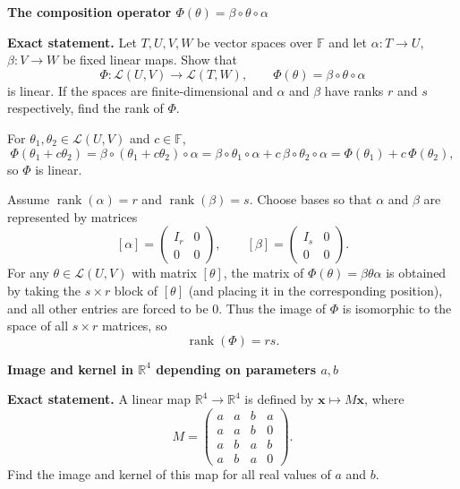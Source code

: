 \begin{problem}[CP-I-0122]
\label{prob:cp-i-0122}
\textbf{The composition operator $\Phi(\theta)=\beta\circ\theta\circ\alpha$}

\textbf{Exact statement.}
\hspace*{1.5em}Let $T,U,V,W$ be vector spaces over $\mathbb F$ and let $\alpha:T\to U$, $\beta:V\to W$ be fixed linear maps.
Show that
\[
\Phi:\mathcal L(U,V)\to \mathcal L(T,W),\qquad \Phi(\theta)=\beta\circ\theta\circ\alpha
\]
is linear. If the spaces are finite-dimensional and $\alpha$ and $\beta$ have ranks $r$ and $s$ respectively,
find the rank of $\Phi$.
\end{problem}

\begin{solution}
For $\theta_1,\theta_2\in\mathcal L(U,V)$ and $c\in\mathbb F$,
\[
\Phi(\theta_1+c\theta_2)
=\beta\circ(\theta_1+c\theta_2)\circ\alpha
=\beta\circ\theta_1\circ\alpha + c\,\beta\circ\theta_2\circ\alpha
=\Phi(\theta_1)+c\,\Phi(\theta_2),
\]
so $\Phi$ is linear.

Assume $\operatorname{rank}(\alpha)=r$ and $\operatorname{rank}(\beta)=s$.
Choose bases so that $\alpha$ and $\beta$ are represented by matrices
\[
[\alpha]=\begin{pmatrix}I_r&0\\0&0\end{pmatrix},
\qquad
[\beta]=\begin{pmatrix}I_s&0\\0&0\end{pmatrix}.
\]
For any $\theta\in\mathcal L(U,V)$ with matrix $[\theta]$, the matrix of $\Phi(\theta)=\beta\theta\alpha$
is obtained by taking the $s\times r$ block of $[\theta]$ (and placing it in the corresponding position),
and all other entries are forced to be $0$.
Thus the image of $\Phi$ is isomorphic to the space of all $s\times r$ matrices, so
\[
\operatorname{rank}(\Phi)=rs.
\]
\end{solution}

\begin{problem}[CP-I-0123]
\label{prob:cp-i-0123}
\textbf{Image and kernel in $\mathbb R^4$ depending on parameters $a,b$}

\textbf{Exact statement.}
\hspace*{1.5em}A linear map $\mathbb R^4\to\mathbb R^4$ is defined by $\mathbf x\mapsto M\mathbf x$, where
\[
M=\begin{pmatrix}
	a&a&b&a\\
	a&a&b&0\\
	a&b&a&b\\
	a&b&a&0
\end{pmatrix}.
\]
Find the image and kernel of this map for all real values of $a$ and $b$.

\end{problem}

